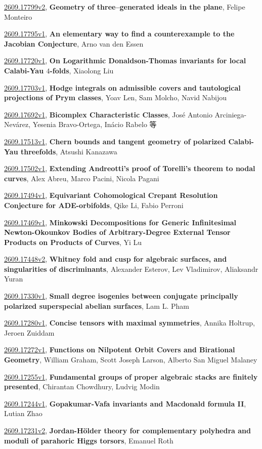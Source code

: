 \documentclass[9pt, a4paper]{article}
\theoremstyle{plain}
\theoremstyle{definition}
\theoremstyle{remark}
\newcommand{\arxiv}[3]{\href{https://arxiv.org/abs/#1}{#1}, \textbf{\textcolor{arxivblue}{#2}}, #3}
\begin{document}
\arxiv{2609.17799v2}{Geometry of three--generated ideals in the plane}{Felipe Monteiro}

\arxiv{2609.17795v1}{An elementary way to find a counterexample to the Jacobian Conjecture}{Arno van den Essen}

\arxiv{2609.17720v1}{On Logarithmic Donaldson-Thomas invariants for local Calabi-Yau $4$-folds}{Xiaolong Liu}

\arxiv{2609.17703v1}{Hodge integrals on admissible covers and tautological projections of Prym classes}{Yoav Len, Sam Molcho, Navid Nabijou}

\arxiv{2609.17692v1}{Bicomplex Characteristic Classes}{José Antonio Arciniega-Nevárez, Yesenia Bravo-Ortega, Inácio Rabelo 等}

\arxiv{2609.17513v1}{Chern bounds and tangent geometry of polarized Calabi-Yau threefolds}{Atsushi Kanazawa}

\arxiv{2609.17502v1}{Extending Andreotti's proof of Torelli's theorem to nodal curves}{Alex Abreu, Marco Pacini, Nicola Pagani}

\arxiv{2609.17494v1}{Equivariant Cohomological Crepant Resolution Conjecture for ADE-orbifolds}{Qike Li, Fabio Perroni}

\arxiv{2609.17469v1}{Minkowski Decompositions for Generic Infinitesimal Newton-Okounkov Bodies of Arbitrary-Degree External Tensor Products on Products of Curves}{Yi Lu}

\arxiv{2609.17448v2}{Whitney fold and cusp for algebraic surfaces, and singularities of discriminants}{Alexander Esterov, Lev Vladimirov, Aliaksandr Yuran}

\arxiv{2609.17330v1}{Small degree isogenies between conjugate principally polarized superspecial abelian surfaces}{Lam L. Pham}

\arxiv{2609.17280v1}{Concise tensors with maximal symmetries}{Annika Holtrup, Jeroen Zuiddam}

\arxiv{2609.17272v1}{Functions on Nilpotent Orbit Covers and Birational Geometry}{William Graham, Scott Joseph Larson, Alberto San Miguel Malaney}

\arxiv{2609.17255v1}{Fundamental groups of proper algebraic stacks are finitely presented}{Chirantan Chowdhury, Ludvig Modin}

\arxiv{2609.17244v1}{Gopakumar-Vafa invariants and Macdonald formula II}{Lutian Zhao}

\arxiv{2609.17231v2}{Jordan-Hölder theory for complementary polyhedra and moduli of parahoric Higgs torsors}{Emanuel Roth}
\end{document}
